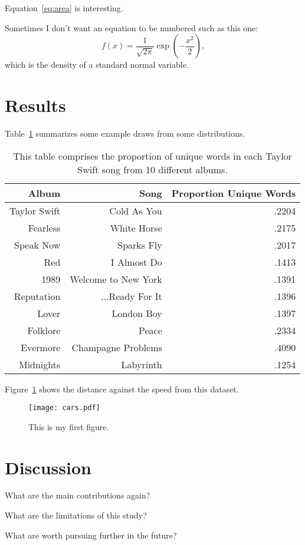 \documentclass[12pt]{article}
\begin{document}
Equation~\eqref{eq:area} is interesting. 

Sometimes I don't want an equation to be numbered such as this one:
\[
  f(x) = \frac{1}{\sqrt{2\pi}} \exp\left( - \frac{x^2}{2} \right),
\]
which is the density of a standard normal variable.



\section{Results}
\label{sec:resu}

Table~\ref{tab:rv} summarizes some example draws from some distributions.

\begin{table}[tbp]
  \caption{This table comprises the proportion of unique words in each Taylor Swift song from 10 different albums.}
  \label{tab:rv}
\centering
\begin{tabular}{rrr}
  \toprule
Album & Song & Proportion Unique Words \\ 
  \midrule
Taylor Swift & Cold As You & .2204 \\ 
  Fearless & White Horse & .2175 \\ 
  Speak Now & Sparks Fly & .2017 \\ 
  Red & I Almost Do & .1413 \\ 
  1989 & Welcome to New York & .1391 \\ 
  Reputation & ...Ready For It & .1396 \\ 
  Lover & London Boy & .1397 \\ 
  Folklore & Peace & .2334 \\ 
  Evermore & Champagne Problems & .4090 \\ 
  Midnights & Labyrinth & .1254 \\ 
   \bottomrule
\end{tabular}
\end{table}

Figure~\ref{fig:cars} shows the distance against the speed from this dataset.


\begin{figure}[tbp]
  \centering
  \texttt{[image: cars.pdf]}
  \caption{This is my first figure.}
  \label{fig:cars}
\end{figure}

\section{Discussion}
\label{sec:disc}

What are the main contributions again?

What are the limitations of this study?

What are worth pursuing further in the future?





\end{document}
